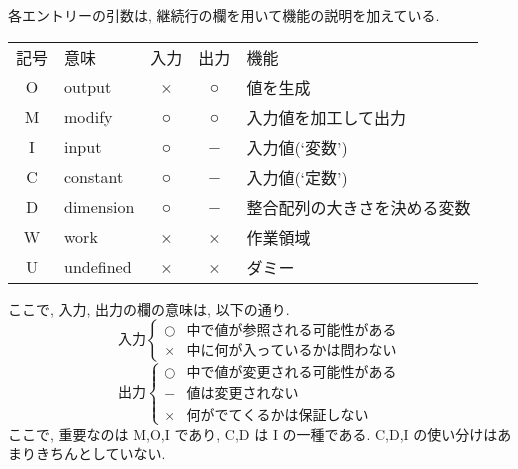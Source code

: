 \・各エントリーの引数は, 継続行の欄を用いて機能の説明を加えている. 
\begin{center}
    \begin{tabular}{clccl} 
    記号 & 意味      & 入力 & 出力 & 機能     \\
    O    & output    &  ×  &  ○  & 値を生成 \\
    M    & modify    &  ○  &  ○  & 入力値を加工して出力 \\
    I    & input     &  ○  &  −  & 入力値(`変数') \\
    C    & constant  &  ○  &  −  & 入力値(`定数') \\
    D    & dimension &  ○  &  −  & 整合配列の大きさを決める変数 \\
    W    & work      &  ×  &  ×  & 作業領域 \\
    U    & undefined &  ×  &  ×  & ダミー 
    \end{tabular}

ここで, 入力, 出力の欄の意味は, 以下の通り.
\[
    入力 \left\{
    \begin{array}{ll}   
      ○ &  中で値が参照される可能性がある \\
      × &  中に何が入っているかは問わない
    \end{array}  
     \right.
\]
\[
    出力 \left\{
    \begin{array}{ll}   
      ○ &  中で値が変更される可能性がある \\
      − &  値は変更されない \\
      × &  何がでてくるかは保証しない
    \end{array}  
     \right.
\]
ここで, 重要なのは M,O,I であり, C,D は I の一種である.
C,D,I の使い分けはあまりきちんとしていない.
\end{center}

